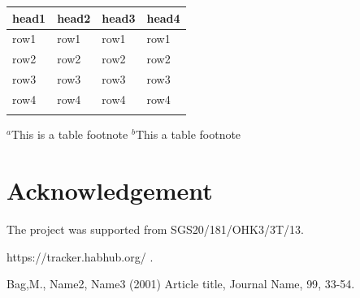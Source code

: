 \documentclass{Rpd}
\begin{document}
\begin{table}[t]
{\begin{tabular}{llll}\toprule
head1 & head2 & head3 & head4\\\midrule
row1 & row1 & row1 & row1\\
row2 & row2 & row2 & row2\\
row3 & row3 & row3 & row3\\
row4 & row4 & row4 & row4\\\botrule
\end{tabular}}{$^a$This is a table footnote\newline
$^b$This a table footnote}
\end{table}


\section*{Acknowledgement}
The project was supported from  SGS20/181/OHK3/3T/13.

\begin{thebibliography}{99.}%
 https://tracker.habhub.org/ .

 Bag,M., Name2, Name3 (2001) Article title, { Journal Name}, { 99}, 33-54.

\end{thebibliography}
\end{document}
